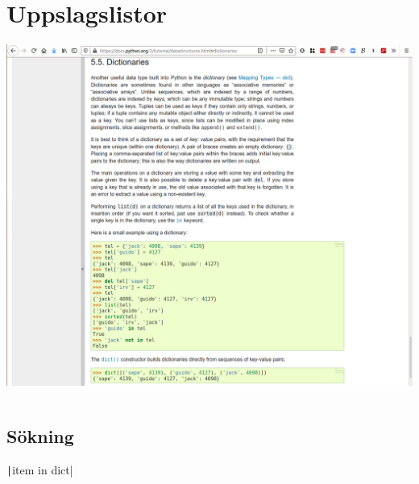 \mode*

\section{Uppslagslistor}

\begin{frame}
  \includegraphics[width=\columnwidth]{figs/docs-dicts.png}
\end{frame}

\begin{frame}[fragile]
  \begin{example}
    \inputminted{python}{examples/phone-small.py}
  \end{example}
\end{frame}

\subsection{Sökning}

\begin{frame}[fragile]
  \texttt|item in dict|
\end{frame}

\begin{frame}[fragile]
  \begin{example}[isin.py]
    \inputminted{python}{examples/isin.py}
  \end{example}
\end{frame}

